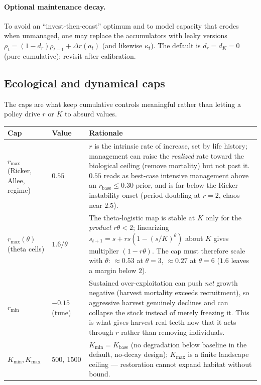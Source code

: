 \documentclass[11pt]{article}
\newcommand{\rbase}{r_{\mathrm{base}}}
\newcommand{\Kbase}{K_{\mathrm{base}}}
\newcommand{\rmax}{r_{\max}}
\newcommand{\rmin}{r_{\min}}
\newcommand{\Kmax}{K_{\max}}
\newcommand{\Kmin}{K_{\min}}
\begin{document}
\paragraph{Optional maintenance decay.} To avoid an ``invest-then-coast'' optimum
and to model capacity that erodes when unmanaged, one may replace the accumulators
with leaky versions $\rho_t=(1-d_r)\rho_{t-1}+\Delta r(a_t)$ (and likewise
$\kappa_t$). The default is $d_r=d_K=0$ (pure cumulative); revisit after
calibration.

\subsection{Ecological and dynamical caps}
The caps are what keep cumulative controls meaningful rather than letting a policy
drive $r$ or $K$ to absurd values.
\begin{longtable}{@{}p{2.6cm}p{4.0cm}p{7.4cm}@{}}
\toprule
Cap & Value & Rationale \\
\midrule
\endhead
$\rmax$ (Ricker, Allee, regime) & $0.55$ & $r$ is the intrinsic rate of increase,
set by life history; management can raise the \emph{realized} rate toward the
biological ceiling (remove mortality) but not past it. $0.55$ reads as best-case
intensive management above an $\rbase\!\le\!0.30$ prior, and is far below the
Ricker instability onset (period-doubling at $r{=}2$, chaos near $2.5$). \\
$\rmax(\theta)$ (theta cells) & $1.6/\theta$ & The theta-logistic map is stable at
$K$ only for the \emph{product} $r\theta<2$; linearizing $s_{t+1}=s+rs(1-(s/K)^
\theta)$ about $K$ gives multiplier $(1-r\theta)$. The cap must therefore scale
with $\theta$: $\approx 0.53$ at $\theta{=}3$, $\approx 0.27$ at $\theta{=}6$
($1.6$ leaves a margin below $2$). \\
$\rmin$ & $-0.15$ (tune) & Sustained over-exploitation can push \emph{net} growth
negative (harvest mortality exceeds recruitment), so aggressive harvest genuinely
declines and can collapse the stock instead of merely freezing it. This is what
gives harvest real teeth now that it acts through $r$ rather than removing
individuals. \\
$\Kmin,\Kmax$ & $500,\ 1500$ & $\Kmin=\Kbase$ (no degradation below baseline in the
default, no-decay design); $\Kmax$ is a finite landscape ceiling --- restoration
cannot expand habitat without bound. \\
\bottomrule
\end{longtable}
\end{document}
